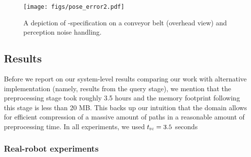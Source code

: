 \documentclass[a4paper]{report}
\begin{document}
\begin{figure}
    \centering
    \texttt{[image: figs/pose\_error2.pdf]}
    \caption{\CaptionTextSize A depiction of \Gfull-specification on a conveyor belt (overhead view) and perception noise handling. 
    }
    \label{fig:pe}
\end{figure}

\subsection{Results}

Before we report on our system-level results comparing our work with alternative implementation (namely, results from the query stage), we mention that the preprocessing stage took roughly 3.5 hours and the memory footprint following this stage is less than 20 MB.
%
This backs up our intuition that the domain allows for efficient compression of a massive amount of paths in a reasonable amount of preprocessing time. In all experiments, we used $t_{\textrm{rc}} =3.5$ seconds




\subsubsection{Real-robot experiments}
\label{sec:robot_results}

\end{document}
